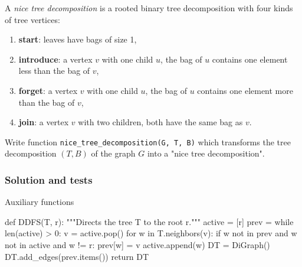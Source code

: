 A \emph{nice tree decomposition} is a rooted binary tree decomposition with four kinds of tree vertices:
\begin{enumerate}
    \item \textbf{start}: leaves have bags of size 1,
    \item \textbf{introduce}: a vertex $v$ with one child $u$, the bag of $u$ contains one element less than the bag of $v$,
    \item \textbf{forget}:  a vertex $v$ with one child $u$, the bag of $u$ contains one element more than the bag of $v$,
    \item \textbf{join}: a vertex $v$ with two children, both have the same bag as $v$.
\end{enumerate}
Write function \verb`nice_tree_decomposition(G, T, B)` which transforms the tree decomposition $(T, B)$ of the graph $G$ into a "nice tree decomposition".

\subsubsection*{Solution and tests}


Auxiliary functions
\begin{sageCell}
    def DDFS(T, r):
    """Directs the tree T to the root r."""
    active = [r]
    prev = {}
    while len(active) > 0:
        v = active.pop()
        for w in T.neighbors(v):
            if w not in prev and w not in active and w != r:
                prev[w] = v
                active.append(w)
    DT = DiGraph()
    DT.add_edges(prev.items())
    return DT
\end{sageCell}

